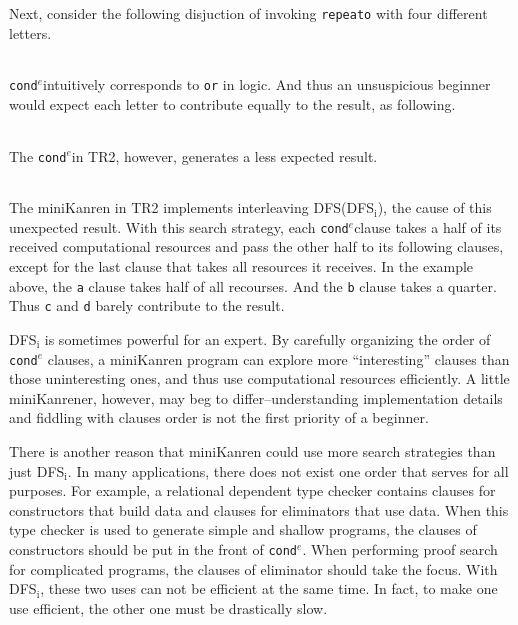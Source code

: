 \documentclass[format=acmlarge, review=true, authordraft=true]{acmart}
\newcommand{\conde}{\texttt{cond$^e$}}
\newcommand{\clisting}[1]{
\begin{center}
  \begin{tabular}{c}
	
    \end{tabular}
\end{center}
}
\newcommand{\DFSi}[0]{DFS$_\textrm{i}$}
\begin{document}
\clisting{Figures/repeato.rkt}

Next, consider the following disjuction of invoking \texttt{repeato} with four 
different letters.

\clisting{Figures/example.rkt}

\conde intuitively corresponds to \texttt{or} in logic. And thus an unsuspicious
beginner would expect each letter to contribute equally to the result, as
following.

\clisting{Figures/run-repeato-fair.rkt}

The \conde in TR2, however, generates a less expected result.

\clisting{Figures/run-repeato-idfs.rkt}

The miniKanren in TR2 implements interleaving DFS(\DFSi), the cause of this 
unexpected result. With this search strategy, each \conde clause takes a half 
of its received computational resources and pass the other half to its 
following clauses, except for the last clause that takes all resources it 
receives. In the example above, the \texttt{a} clause takes half of all 
recourses. And the \texttt{b} clause takes a quarter. Thus \texttt{c} and 
\texttt{d} barely contribute to the result.


\DFSi{} is sometimes powerful for an expert. By carefully organizing the order 
of \conde{} clauses, a miniKanren program can explore more ``interesting'' 
clauses than those uninteresting ones, and thus use computational resources 
efficiently. A little miniKanrener, however, may beg to differ--understanding
implementation details and fiddling with clauses order is not the first
priority of a beginner.

There is another reason that miniKanren could use more search strategies than
just \DFSi. In many applications, there does not exist one order that serves
for all purposes. For example, a relational dependent type checker contains
clauses for constructors that build data and clauses for eliminators that use
data. When this type checker is used to generate simple and shallow programs,
the clauses of constructors should be put in the front of \conde.
When performing proof search for complicated programs, the clauses of eliminator
should take the focus. With \DFSi, these two uses can not be efficient at the
same time. In fact, to make one use efficient, the other one must be drastically
slow.
\end{document}
